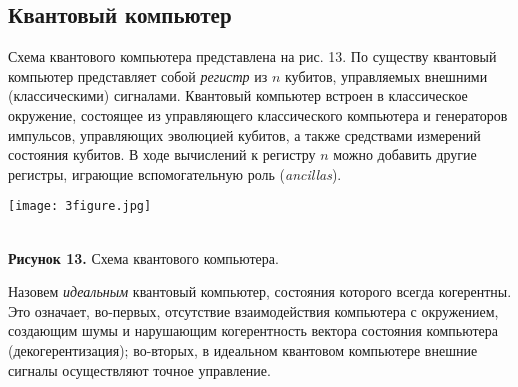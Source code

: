 \begin{multicols}{2}
    \section*{Квантовый компьютер} 
    \normalsize{
        Схема квантового компьютера представлена на рис. 13.
    По существу квантовый компьютер представляет собой \emph{регистр} из $n$ кубитов,
    управляемых внешними (классическими) сигналами. Квантовый компьютер встроен в классическое
    окружение, состоящее из управляющего классического компьютера и генераторов импульсов,
    управляющих эволюцией кубитов, а также средствами измерений состояния кубитов. В ходе вычислений к регистру $n$ можно добавить другие
    регистры, играющие вспомогательную роль (\emph{ancillas}).
    }\\
    \begin{flushleft}
        \begin{minipage}{0.3\textwidth}{\texttt{[image: 3figure.jpg]}}
        \end{minipage}\\
        \vspace{0.3cm}
        \footnotesize{\textbf{Рисунок 13.} Схема квантового компьютера.}
    \end{flushleft}
    \normalsize{
        Назовем \emph{идеальным} квантовый компьютер, состояния которого всегда когерентны. Это означает, во-первых, отсутствие взаимодействия компьютера
        с окружением, создающим шумы и нарушающим когерентность вектора состояния компьютера (декогерентизация); во-вторых, в идеальном квантовом компьютере
        внешние сигналы осуществляют точное управление.
        
}
\end{multicols}
